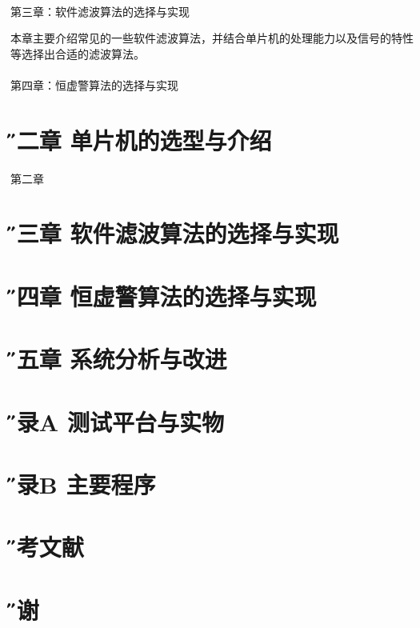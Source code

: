 \documentclass[12pt]{article} %
\newcommand{\xiaosanhao}{\fontsize{15pt}{\baselineskip}\selectfont}    %
\begin{document}
          \paragraph{ \quad} 第三章：软件滤波算法的选择与实现
          \par 本章主要介绍常见的一些软件滤波算法，并结合单片机的处理能力以及信号的特性等选择出合适的滤波算法。
           \paragraph{ \quad} 第四章：恒虚警算法的选择与实现
             \par  
               
               
               
                  
                   
                   
                   
\section{\xiaosanhao \H 第二章 \quad 单片机的选型与介绍}
第二章 \LaTeXe



 \section{\xiaosanhao \H 第三章 \quad 软件滤波算法的选择与实现}
 
 
 
 
 
 \section{\xiaosanhao \H 第四章 \quad 恒虚警算法的选择与实现}
 
  \section{\xiaosanhao \H 第五章 \quad 系统分析与改进}
 
  \section{\xiaosanhao \H 附录A \quad 测试平台与实物}
  
  \section{\xiaosanhao \H 附录B \quad 主要程序}
  
    \section{\xiaosanhao \H 参考文献}
    
      \section{\xiaosanhao \H 致谢}
 
\end{document}
